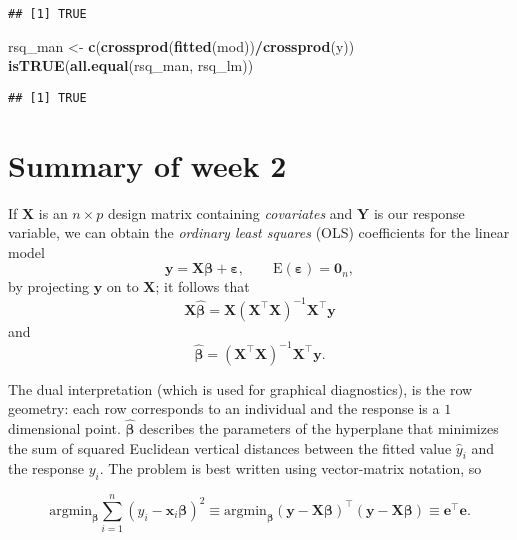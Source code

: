 \documentclass[]{book}
\newenvironment{Shaded}{\begin{snugshade}}{\end{snugshade}}
\newcommand{\KeywordTok}[1]{\textcolor[rgb]{0.13,0.29,0.53}{\textbf{#1}}}
\newcommand{\NormalTok}[1]{#1}
\newcommand{\OperatorTok}[1]{\textcolor[rgb]{0.81,0.36,0.00}{\textbf{#1}}}
\newcommand{\StringTok}[1]{\textcolor[rgb]{0.31,0.60,0.02}{#1}}
\theoremstyle{definition}
\theoremstyle{definition}
\theoremstyle{definition}
\theoremstyle{remark}
\begin{document}
\begin{verbatim}
## [1] TRUE
\end{verbatim}

\begin{Shaded}
\begin{Highlighting}[]
\NormalTok{rsq_man <-}\StringTok{ }\KeywordTok{c}\NormalTok{(}\KeywordTok{crossprod}\NormalTok{(}\KeywordTok{fitted}\NormalTok{(mod))}\OperatorTok{/}\KeywordTok{crossprod}\NormalTok{(y))}
\KeywordTok{isTRUE}\NormalTok{(}\KeywordTok{all.equal}\NormalTok{(rsq_man, rsq_lm))}
\end{Highlighting}
\end{Shaded}

\begin{verbatim}
## [1] TRUE
\end{verbatim}

\hypertarget{summary-of-week-2}{%
\section{Summary of week 2}\label{summary-of-week-2}}

If \(\mathbf{X}\) is an \(n \times p\) design matrix containing
\emph{covariates} and \(\boldsymbol{Y}\) is our response variable, we
can obtain the \emph{ordinary least squares} (OLS) coefficients for the
linear model
\[\boldsymbol{y} = \mathbf{X}\boldsymbol{\beta}+ \boldsymbol{\varepsilon}, \qquad \mathrm{E}(\boldsymbol{\varepsilon})=\boldsymbol{0}_n,\]
by projecting \(\boldsymbol{y}\) on to \(\mathbf{X}\); it follows that
\[\mathbf{X}\hat{\boldsymbol{\beta}}=\mathbf{X}(\mathbf{X}^\top\mathbf{X})^{-1}\mathbf{X}^\top{\boldsymbol{y}}\]
and
\[\hat{\boldsymbol{\beta}} = (\mathbf{X}^\top\mathbf{X})^{-1}\mathbf{X}^\top{\boldsymbol{y}}.\]

The dual interpretation (which is used for graphical diagnostics), is
the row geometry: each row corresponds to an individual and the response
is a \(1\) dimensional point. \(\hat{\boldsymbol{\beta}}\) describes the
parameters of the hyperplane that minimizes the sum of squared Euclidean
vertical distances between the fitted value \(\hat{y}_i\) and the
response \(y_i\). The problem is best written using vector-matrix
notation, so

\[ \mathrm{argmin}_{\boldsymbol{\beta}} \sum_{i=1}^n (y_i- \mathbf{x}_i\boldsymbol{\beta})^2 \equiv \mathrm{argmin}_{\boldsymbol{\beta}} (\boldsymbol{y} - \mathbf{X}\boldsymbol{\beta})^\top(\boldsymbol{y}-\mathbf{X}\boldsymbol{\beta}) \equiv \boldsymbol{e}^\top\boldsymbol{e}.
\]
\end{document}
